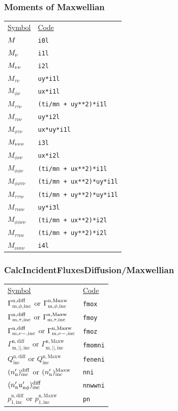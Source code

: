 \subsubsection{Moments of Maxwellian}
\begin{tabular}{L{3cm} L{8cm}}
\underline{Symbol} & \underline{Code} \\
$M$ & \texttt{i0l} \\
$M_\nu$ & \texttt{i1l} \\
$M_{\nu \nu}$ & \texttt{i2l} \\
$M_{\tau \nu}$ &  \texttt{uy*i1l} \\
$M_{\phi \nu}$ & \texttt{ux*i1l} \\
$M_{\tau \tau \nu}$ & \texttt{(ti/mn + uy**2)*i1l} \\
$M_{\tau \nu \nu}$ &  \texttt{uy*i2l}\\
$M_{\phi \tau \nu}$ &  \texttt{ux*uy*i1l}\\
$M_{\nu \nu \nu}$ &  \texttt{i3l}\\
$M_{\phi \nu \nu}$ &  \texttt{ux*i2l}\\
$M_{\phi \phi \nu}$ &  \texttt{(ti/mn + ux**2)*i1l}\\
$M_{\phi \phi \tau \nu}$ &  \texttt{(ti/mn + ux**2)*uy*i1l}\\
$M_{\tau \tau \tau \nu}$ &  \texttt{(ti/mn + uy**2)*uy*i1l}\\
$M_{\tau \nu \nu \nu}$ &  \texttt{uy*i3l}\\
$M_{\phi \phi \nu \nu}$ &  \texttt{(ti/mn + ux**2)*i2l}\\
$M_{\tau \tau \nu \nu}$ &  \texttt{(ti/mn + uy**2)*i2l} \\
$M_{\nu \nu \nu \nu}$ &  \texttt{i4l}\\
\end{tabular}

\subsubsection{CalcIncidentFluxesDiffusion/Maxwellian}

\begin{tabular}{L{4cm} L{6cm}}
\underline{Symbol} & \underline{Code} \\
$\Gamma^{\mathrm{n,diff}}_{\mathrm{m,\phi,inc}} $ or $ \Gamma^{\mathrm{n,Maxw}}_{\mathrm{m,\phi,inc}}$ & \texttt{fmox} \\
$\Gamma^{\mathrm{n,diff}}_{\mathrm{m,\tau,inc}} $ or $ \Gamma^{\mathrm{n,Maxw}}_{\mathrm{m,\tau,inc}}$ & \texttt{fmoy} \\
$\Gamma^{\mathrm{n,diff}}_{\mathrm{m,\nu-,inc}} $ or $ \Gamma^{\mathrm{n,Maxw}}_{\mathrm{m,\nu-,inc}}$ & \texttt{fmoz} \\
$ \Gamma^{\mathrm{n,diff}}_{\mathrm{m,||,inc}}$ or  $\Gamma^{\mathrm{n,Maxw}}_{\mathrm{m,||,inc}} $ & \texttt{fmomni} \\
$Q^{\mathrm{n,diff}}_{\mathrm{inc}} $ or  $ Q^{\mathrm{n,Maxw}}_{\mathrm{inc}}$ & \texttt{feneni} \\
$(n_{\mathrm{n}}')_{\mathrm{inc}}^{\mathrm{diff}} $ or  $ (n_{\mathrm{n}}')_{\mathrm{inc}}^{\mathrm{Maxw}}$ & \texttt{nni} \\
$ (n_{\mathrm{n}}' u_{\mathrm{n}\phi}')_{\mathrm{inc}}^{\mathrm{diff}}$ & \texttt{nnwwni} \\
$p^{\mathrm{n,diff}}_{\mathrm{1,inc}} $ or  $ p^{\mathrm{n,Maxw}}_{\mathrm{1,inc}}$ & \texttt{pn} \\
\end{tabular}

